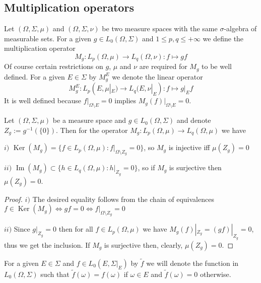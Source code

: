 
\subsection{Multiplication operators}
\label{SubSectionMultiplicationOperators}

Let $(\Omega,\Sigma,\mu)$ and $(\Omega,\Sigma,\nu)$ be two measure spaces with the same $\sigma$-algebra of measurable sets. For a given $g\in L_0(\Omega,\Sigma)$ and $1\leq p,q\leq +\infty$ we define the multiplication operator
$$
M_g:L_p(\Omega,\mu)\to L_q(\Omega,\nu): f\mapsto g f
$$ 
Of course certain restrictions on $g$, $\mu$ and $\nu$ are required for $M_g$ to be well defined. For a given $E\in\Sigma$ by $M_g^E$ we denote the linear operator
$$
M_g^E:L_p(E,\mu|_E)\to L_q(E,\nu|_E):f\mapsto g|_E f
$$
It is well defined because $f|_{\Omega\setminus E}=0$ implies $M_g(f)|_{\Omega\setminus E}=0$. 

\begin{proposition}\label{MultpOpSurjInjDesc} Let $(\Omega,\Sigma,\mu)$ be a measure space and $g\in L_0(\Omega,\Sigma)$ and denote $Z_g:=g^{-1}(\{0\})$. Then for the operator $M_g:L_p(\Omega,\mu)\to L_q(\Omega,\mu)$ we have

$i)$ $\operatorname{Ker}(M_g)=\{f\in L_p(\Omega,\mu):f|_{\Omega\setminus {Z_g}}=0\}$, so $M_g$ is injective iff $\mu(Z_g)=0$

$ii)$ $\operatorname{Im}(M_g)\subset\{h\in L_q(\Omega,\mu): h|_{Z_g}=0\}$, so if $M_g$ is surjective then $\mu(Z_g)=0$.

\end{proposition}
\begin{proof}
$i)$ The desired equality follows from the chain of equivalences
$f\in\operatorname{Ker}(M_g)
\Longleftrightarrow g f=0
\Longleftrightarrow f|_{\Omega\setminus Z_g}=0$


$ii)$ Since $g|_{Z_g}=0$ then for all $f\in L_p(\Omega,\mu)$ we have $M_g(f)|_{Z_g}=(g f)|_{Z_g}=0$, thus we get the inclusion. If $M_g$ is surjective then, clearly,  $\mu(Z_g)=0$.
\end{proof}

For a given $E\in \Sigma$ and $f\in L_0(E,\Sigma|_{E})$ by $\widetilde{f}$ we will denote the function in $L_0(\Omega, \Sigma)$ such that $\widetilde{f}(\omega)=f(\omega)$ if $\omega\in E$ and $\widetilde{f}(\omega)=0$ otherwise.

